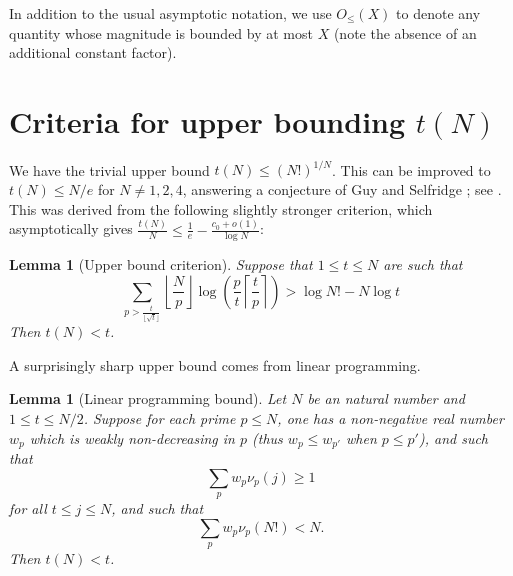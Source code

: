 \documentclass[12pt,a4paper,reqno]{amsart}
\numberwithin{equation}{section}
\theoremstyle{plain}
\newtheorem{lemma}[theorem]{Lemma}
\theoremstyle{definition}
\begin{document}
In addition to the usual asymptotic notation, we use $O_{\leq}(X)$ to denote any quantity whose magnitude is bounded by at most $X$ (note the absence of an additional constant factor).


  
\section{Criteria for upper bounding \texorpdfstring{$t(N)$}{t(N)}}

We have the trivial upper bound $t(N) \leq (N!)^{1/N}$.  This can be improved to $t(N) \leq N/e$ for $N \neq 1,2,4$, answering a conjecture of Guy and Selfridge \cite{guy-selfridge}; see \cite{tao}.  This was derived from the following slightly stronger criterion, which asymptotically gives $\frac{t(N)}{N} \leq \frac{1}{e} - \frac{c_0+o(1)}{\log N}$:

\begin{lemma}[Upper bound criterion]\label{upper-crit}  \cite[Lemma 2.1]{tao} Suppose that $1 \leq t \leq N$ are such that
  \begin{equation}\label{contra}
     \sum_{p > \frac{t}{\lfloor\sqrt{t}\rfloor}} \left\lfloor \frac{N}{p} \right\rfloor \log \left( \frac{p}{t} \left\lceil \frac{t}{p} \right\rceil \right) > \log N! - N \log t
  \end{equation}
  Then $t(N) < t$.
  \end{lemma}

A surprisingly sharp upper bound comes from linear programming.

\begin{lemma}[Linear programming bound]\label{lp-upper}  Let $N$ be an natural number and $1 \leq t \leq N/2$.  Suppose for each prime $p \leq N$, one has a non-negative real number $w_p$ which is weakly non-decreasing in $p$ (thus $w_p \leq w_{p'}$ when $p \leq p'$), and such that
\begin{equation}\label{pj}
 \sum_p w_p \nu_p(j) \geq 1
\end{equation}
for all $t \leq j \leq N$, and such that
\begin{equation}\label{hyp}
\sum_p w_p \nu_p(N!) < N.
\end{equation}
Then $t(N) < t$.
\end{lemma}
\end{document}

